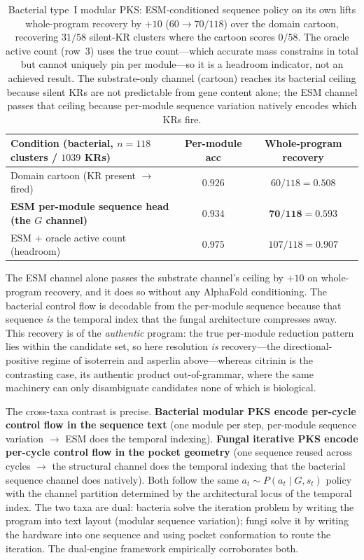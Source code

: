 \begin{table}[h]
\centering\small
\begin{tabular}{@{}lcc@{}}
\toprule
Condition (bacterial, $n{=}118$ clusters / $1039$ KRs) & Per-module acc & Whole-program recovery \\
\midrule
Domain cartoon (KR present $\to$ fired)              & $0.926$ & $60/118 = 0.508$ \\
\textbf{ESM per-module sequence head (the $G$ channel)} & $0.934$ & $\mathbf{70/118 = 0.593}$ \\
ESM $+$ oracle active count (headroom)               & $0.975$ & $107/118 = 0.907$ \\
\bottomrule
\end{tabular}
\caption{Bacterial type~I modular PKS: ESM-conditioned sequence policy on its own
lifts whole-program recovery by $+10$ ($60\!\to\!70/118$) over the domain cartoon,
recovering $31/58$ silent-KR clusters where the cartoon scores $0/58$. The oracle
active count (row~3) uses the true count---which accurate mass constrains in total but
cannot uniquely pin per module---so it is a headroom indicator, not an achieved result. The substrate-only channel (cartoon) reaches its bacterial ceiling because
silent KRs are not predictable from gene content alone; the ESM channel passes that
ceiling because per-module sequence variation natively encodes which KRs fire.}
\label{tab:bacterial-cap}
\end{table}

The ESM channel alone passes the substrate channel's ceiling by $+10$ on whole-program
recovery, and it does so without any AlphaFold conditioning. The bacterial control flow
is decodable from the per-module sequence because that sequence \emph{is} the temporal
index that the fungal architecture compresses away. This recovery is of the
\emph{authentic} program: the true per-module reduction pattern lies within the candidate
set, so here resolution \emph{is} recovery---the directional-positive regime of isoterrein
and asperlin above---whereas citrinin is the contrasting case, its authentic product
out-of-grammar, where the same machinery can only disambiguate candidates none of which is
biological.

The cross-taxa contrast is precise. \textbf{Bacterial modular PKS encode per-cycle
control flow in the sequence text} (one module per step, per-module sequence variation
$\to$ ESM does the temporal indexing). \textbf{Fungal iterative PKS encode per-cycle
control flow in the pocket geometry} (one sequence reused across cycles $\to$ the
structural channel does the temporal indexing that the bacterial sequence
channel does natively). Both follow the same $a_t \sim P(a_t \mid G, s_t)$ policy
with the channel partition determined by the architectural locus of the temporal index.
The two taxa are dual: bacteria solve the iteration problem by writing the program into
text layout (modular sequence variation); fungi solve it by writing the hardware into
one sequence and using pocket conformation to route the iteration. The dual-engine
framework empirically corroborates both.


